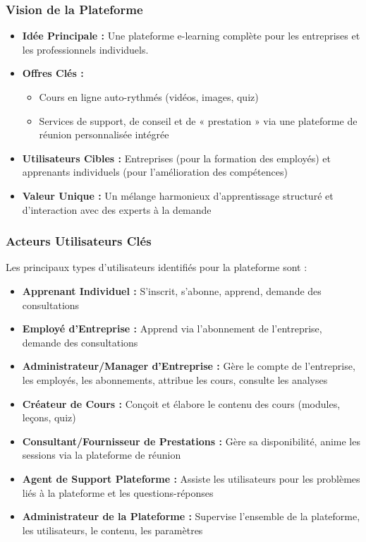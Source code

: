 \documentclass[12pt, a4paper]{article}
\begin{document}
\subsubsection{Vision de la Plateforme}
\begin{itemize}
  \item \textbf{Idée Principale :} Une plateforme e-learning complète pour les entreprises et les professionnels individuels.
  \item \textbf{Offres Clés :}
    \begin{itemize}
      \item Cours en ligne auto-rythmés (vidéos, images, quiz)
      \item Services de support, de conseil et de « prestation » via une plateforme de réunion personnalisée intégrée
    \end{itemize}
  \item \textbf{Utilisateurs Cibles :} Entreprises (pour la formation des employés) et apprenants individuels (pour l'amélioration des compétences)
  \item \textbf{Valeur Unique :} Un mélange harmonieux d'apprentissage structuré et d'interaction avec des experts à la demande
\end{itemize}

\subsubsection{Acteurs Utilisateurs Clés}
Les principaux types d'utilisateurs identifiés pour la plateforme sont :
\begin{itemize}
  \item \textbf{Apprenant Individuel :} S'inscrit, s'abonne, apprend, demande des consultations
  \item \textbf{Employé d'Entreprise :} Apprend via l'abonnement de l'entreprise, demande des consultations
  \item \textbf{Administrateur/Manager d'Entreprise :} Gère le compte de l'entreprise, les employés, les abonnements, attribue les cours, consulte les analyses
  \item \textbf{Créateur de Cours :} Conçoit et élabore le contenu des cours (modules, leçons, quiz)
  \item \textbf{Consultant/Fournisseur de Prestations :} Gère sa disponibilité, anime les sessions via la plateforme de réunion
  \item \textbf{Agent de Support Plateforme :} Assiste les utilisateurs pour les problèmes liés à la plateforme et les questions-réponses
  \item \textbf{Administrateur de la Plateforme :} Supervise l'ensemble de la plateforme, les utilisateurs, le contenu, les paramètres
\end{itemize}
\end{document}
